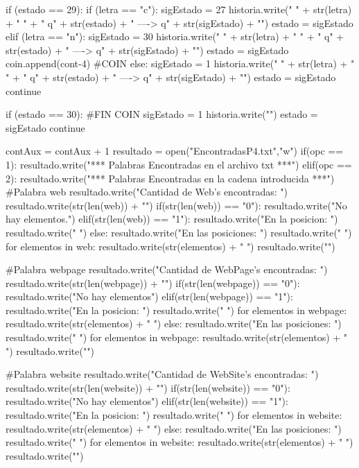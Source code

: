 \documentclass{article}
\begin{document}
\begin{python}
				if (estado == 29):                    
					if (letra == "c"):
						sigEstado = 27
						historia.write(" { " + str(letra) + " } " + "  q" + str(estado) + "  ---->  q" + str(sigEstado) + "\n")
						estado = sigEstado              
					elif (letra == "n"):
						sigEstado = 30
						historia.write(" { " + str(letra) + " } " + "  q" + str(estado) + "  ---->  q" + str(sigEstado) + "\n")
						estado = sigEstado 
						coin.append(cont-4) #COIN            
					else:
						sigEstado = 1
						historia.write(" { " + str(letra) + " } " + "  q" + str(estado) + "  ---->  q" + str(sigEstado) + "\n")
						estado = sigEstado 
					continue
			
				if (estado == 30): #FIN COIN
					sigEstado = 1
					historia.write("\n")
					estado = sigEstado 
				continue
				
				contAux = contAux + 1
			resultado = open("EncontradasP4.txt","w")
			if(opc == 1):
				resultado.write("*** Palabras Encontradas en el archivo txt ***\n\n")
			elif(opc == 2):
				resultado.write("*** Palabras Encontradas en la cadena introducida ***\n\n")
			#Palabra web    
			resultado.write("Cantidad de Web's encontradas: ")
			resultado.write(str(len(web)) + "\n")
			if(str(len(web)) == "0"):
				resultado.write("No hay elementos.")
			elif(str(len(web)) == "1"):
				resultado.write("En la posicion: ")
				resultado.write(" ")  
			else:  
				resultado.write("En las posiciones: ")
				resultado.write(" ")  
			for elementos in web:
				resultado.write(str(elementos) + " ")
			resultado.write("\n\n")
			
			#Palabra webpage    
			resultado.write("Cantidad de WebPage's encontradas: ")
			resultado.write(str(len(webpage)) + "\n")
			if(str(len(webpage)) == "0"):
				resultado.write("No hay elementos")
			elif(str(len(webpage)) == "1"):
				resultado.write("En la posicion: ")
				resultado.write(" ") 
				for elementos in webpage:
					resultado.write(str(elementos) + " ") 
			else:  
				resultado.write("En las posiciones: ")
				resultado.write(" ") 
			for elementos in webpage:
				resultado.write(str(elementos) + " ")     
			resultado.write("\n\n")
			
			#Palabra website    
			resultado.write("Cantidad de WebSite's encontradas: ")
			resultado.write(str(len(website)) + "\n")
			if(str(len(website)) == "0"):
				resultado.write("No hay elementos")
			elif(str(len(website)) == "1"):
				resultado.write("En la posicion: ")
				resultado.write(" ") 
				for elementos in website:
					resultado.write(str(elementos) + " ") 
			else:  
				resultado.write("En las posiciones: ")
				resultado.write(" ") 
				for elementos in website:
					resultado.write(str(elementos) + " ")     
			resultado.write("\n\n")
			

\end{python}
\end{document}
